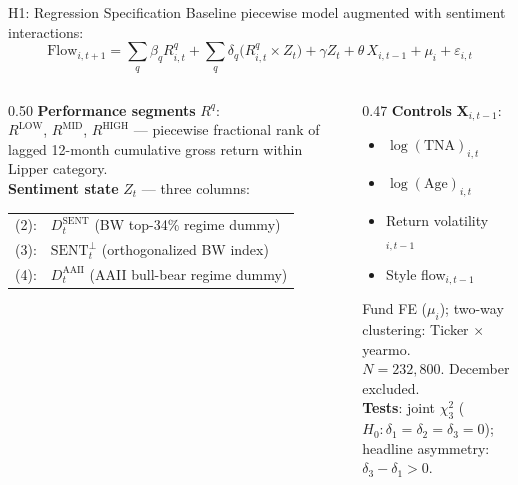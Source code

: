 \documentclass[10pt, aspectratio=169]{beamer}
\begin{document}
\begin{frame}{H1: Regression Specification}
  \small Baseline piecewise model augmented with sentiment interactions:
  \vspace{-2pt}
  \[
    \text{Flow}_{i,t+1} = \sum_{q} \beta_q R^q_{i,t}
    + \sum_{q} \delta_q \bigl(R^q_{i,t} \times Z_t\bigr)
    + \gamma Z_t
    + \theta\, X_{i,t-1}
    + \mu_i + \varepsilon_{i,t}
  \]
  \vspace{-2pt}
  \begin{columns}[T]
    \begin{column}{0.50\textwidth}
      \footnotesize\textbf{Performance segments} $R^q$:\\
      $R^{\text{LOW}}$, $R^{\text{MID}}$, $R^{\text{HIGH}}$ — piecewise fractional rank of lagged 12-month cumulative gross return within Lipper category.\\[5pt]
      \textbf{Sentiment state} $Z_t$ — three columns:
      \vspace{2pt}\\
      \begin{tabular}{@{}ll@{}}
        (2): & $D^{\text{SENT}}_t$ (BW top-34\% regime dummy) \\
        (3): & $\text{SENT}^\perp_t$ (orthogonalized BW index) \\
        (4): & $D^{\text{AAII}}_t$ (AAII bull-bear regime dummy) \\
      \end{tabular}
    \end{column}
    \begin{column}{0.47\textwidth}
      \footnotesize\textbf{Controls} $\mathbf{X}_{i,t-1}$:
      \begin{itemize}\itemsep1pt
        \item $\log(\text{TNA})_{i,t}$
        \item $\log(\text{Age})_{i,t}$
        \item Return volatility$_{i,t-1}$
        \item Style flow$_{i,t-1}$
      \end{itemize}
      \vspace{3pt}
      Fund FE ($\mu_i$); two-way clustering: Ticker $\times$ yearmo.\\
      $N=232{,}800$. December excluded.\\[4pt]
      \textbf{Tests}: joint $\chi^2_3$ ($H_0: \delta_1=\delta_2=\delta_3=0$);\\
      headline asymmetry: $\delta_3 - \delta_1 > 0$.
    \end{column}
  \end{columns}
\end{frame}
\end{document}
